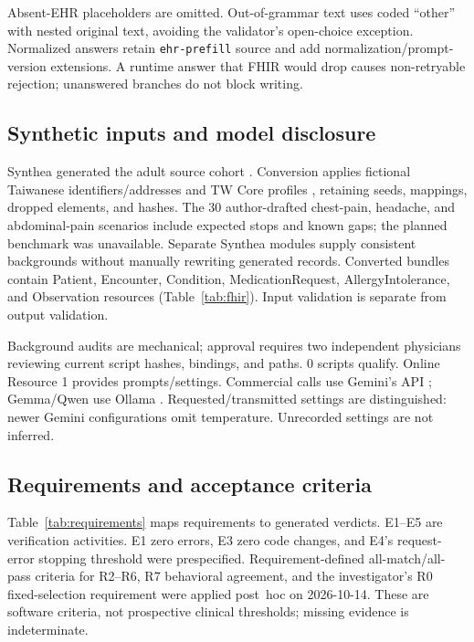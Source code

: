 \documentclass[lineno,pdflatex,sn-basic]{sn-jnl}%
\theoremstyle{thmstyleone}%
\theoremstyle{thmstyletwo}%
\theoremstyle{thmstylethree}%
\newcommand{\ScenarioCount}{30}
\newcommand{\ValidatedScriptCount}{0}
\begin{document}
Absent-EHR placeholders are omitted. Out-of-grammar text uses coded ``other'' with
nested original text, avoiding the validator's open-choice exception. Normalized
answers retain \texttt{ehr-prefill} source and add normalization/prompt-version
extensions. A runtime answer that FHIR would drop causes non-retryable rejection;
unanswered branches do not block writing.

\subsection{Synthetic inputs and model disclosure}
Synthea generated the adult source cohort \citep{syntheaMethod,syntheaSoftware}.
Conversion applies fictional Taiwanese identifiers/addresses and TW Core profiles
\citep{twcoreIG}, retaining seeds, mappings, dropped elements, and hashes. The
\ScenarioCount{} author-drafted chest-pain, headache, and abdominal-pain scenarios
include expected stops and known gaps; the planned benchmark was unavailable.
Separate Synthea modules supply consistent backgrounds without manually rewriting
generated records. Converted bundles contain Patient, Encounter, Condition,
MedicationRequest, AllergyIntolerance, and Observation resources
(Table~\ref{tab:fhir}). Input validation is separate from output validation.

Background audits are mechanical; approval requires two independent physicians
reviewing current script hashes, bindings, and paths. \ValidatedScriptCount{}
scripts qualify. Online Resource 1 provides prompts/settings. Commercial calls
use Gemini's API \citep{googleGeminiAPI}; Gemma/Qwen use Ollama
\citep{ollamaSoftware,gemmaThree,qwenTwoFive}. Requested/transmitted settings are
distinguished: newer Gemini configurations omit temperature. Unrecorded settings
are not inferred.

\subsection{Requirements and acceptance criteria}
Table~\ref{tab:requirements} maps requirements to generated verdicts. E1--E5 are
verification activities. E1 zero errors, E3 zero code changes, and E4's request-error
stopping threshold were prespecified. Requirement-defined all-match/all-pass
criteria for R2--R6, R7 behavioral agreement, and the investigator's R0 fixed-selection
requirement were applied post~hoc on 2026-10-14. These are software criteria,
not prospective clinical thresholds; missing evidence is indeterminate.
\end{document}
